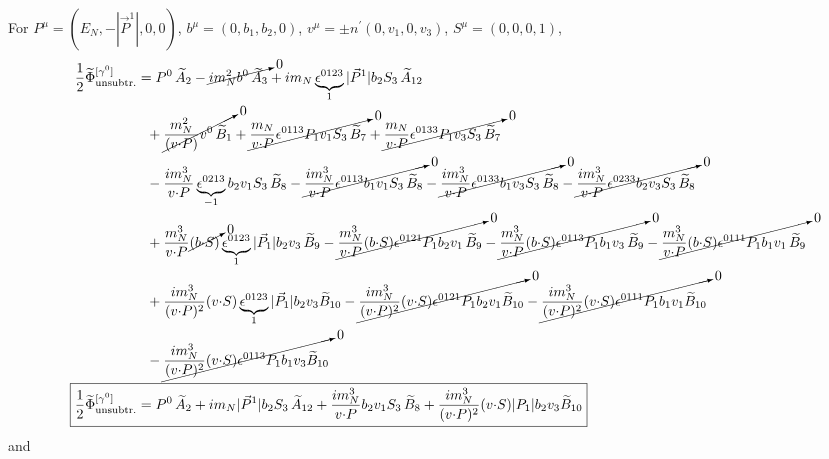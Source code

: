 \documentclass[]{article}
\numberwithin{equation}{section}
\newcommand{\tcdot}{{\cdot}}
\newcommand{\tAmp}{\widetilde{A}}
\newcommand{\tBmp}{\widetilde{B}}
\newcommand{\tAmp}{\ensuremath{\widetilde{A}^{(+)}}}
\newcommand{\tBmp}{\ensuremath{\widetilde{B}^{(+)}}}
\newcommand{\bvec}{b}
\newcommand{\mN}{m_N}
\newcommand{\unsub}{\text{unsubtr.}}
\begin{document}
For $P^{\mu}=(E_N, -|\vec{P}^1|,0,0)$, $b^{\mu}=(0,b_{1},b_{2},0)$, $v^{\mu}=\pm n^{\prime}(0,v_{1},0,v_{3})$, $S^{\mu}=(0,0,0,1)$,
\begin{align}
    \frac{1}{2}\widetilde \Phi^{[\gamma^{0}]}_{\unsub} & = 
		P^0\, \tAmp_2 - \cancelto{0}{i \mN^2 \bvec^0\, \tAmp_3}
		+ i \mN \underbrace{\epsilon^{0 123}}_{1} |\vec{P}^1| \bvec_2 S_3\, \tAmp_{12} \nonumber \\ &
		~~+ \cancelto{0}{\frac{\mN^2}{(v \tcdot P)} v^0\, \tBmp_1 }
		+ \cancelto{0}{\frac{\mN}{v \tcdot P} \epsilon^{0 113} P_1 v_1 S_3\, \tBmp_7  }+ \cancelto{0}{\frac{\mN}{v \tcdot P} \epsilon^{0 133} P_1 v_3 S_3\, \tBmp_7  }
		 \nonumber \\ &
		~~- \frac{ i \mN^3}{v \tcdot P} \underbrace{\epsilon^{0 213}}_{-1} \bvec_2 v_1 S_3\, \tBmp_8 - \cancelto{0}{\frac{ i \mN^3}{v \tcdot P}\epsilon^{0 113} \bvec_1 v_1 S_3\, \tBmp_8}- \cancelto{0}{\frac{ i \mN^3}{v \tcdot P}\epsilon^{0 133} \bvec_1 v_3 S_3\, \tBmp_8}- \cancelto{0}{\frac{ i \mN^3}{v \tcdot P}\epsilon^{0 233} \bvec_2 v_3 S_3\, \tBmp_8}\nonumber \\ &
		~~+ \frac{\mN^3}{v \tcdot P} \cancelto{0}{(\bvec \tcdot S)} \underbrace{\epsilon^{0 123}}_{1} |\vec{P}_1| \bvec_2 v_3\, \tBmp_9- \cancelto{0}{\frac{\mN^3}{v \tcdot P} (\bvec \tcdot S) \epsilon^{0 121} P_1 \bvec_2 v_1\, \tBmp_9}- \cancelto{0}{\frac{\mN^3}{v \tcdot P} (\bvec \tcdot S) \epsilon^{0 113} P_1 \bvec_1 v_3\, \tBmp_9}- \cancelto{0}{\frac{\mN^3}{v \tcdot P} (\bvec \tcdot S) \epsilon^{0 111} P_1 \bvec_1 v_1\, \tBmp_9}\nonumber \\ &
		~~+ \frac{i \mN^3}{(v \tcdot P)^2} (v \tcdot S) \underbrace{\epsilon^{0 123}}_{1} |\vec{P}_1| \bvec_2 v_3 \tBmp_{10}
		- \cancelto{0}{\frac{i \mN^3}{(v \tcdot P)^2} (v \tcdot S) \epsilon^{0 121} P_1 \bvec_2 v_1 \tBmp_{10}}- \cancelto{0}{\frac{i \mN^3}{(v \tcdot P)^2} (v \tcdot S) \epsilon^{0 111} P_1 \bvec_1 v_1 \tBmp_{10}}\nonumber \\ &
		~~- \cancelto{0}{\frac{i \mN^3}{(v \tcdot P)^2} (v \tcdot S) \epsilon^{0 113} P_1 \bvec_1 v_3 \tBmp_{10}}\\
  \Aboxed{ \frac{1}{2}\widetilde \Phi^{[\gamma^{0}]}_{\unsub}& = P^0\, \tAmp_2  + i \mN  |\vec{P}^1| \bvec_2 S_3\, \tAmp_{12}+ \frac{ i \mN^3}{v \tcdot P}  \bvec_2 v_1 S_3\, \tBmp_8+ \frac{i \mN^3}{(v \tcdot P)^2} (v \tcdot S)  |P_1| \bvec_2 v_3 \tBmp_{10}}
\end{align}
and
\end{document}
